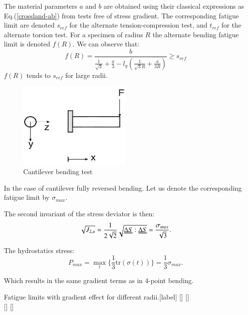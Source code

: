 \documentclass[3p,times,procedia,number]{elsarticle}
\begin{document}
The material parameters $a$ and $b$ are obtained using their classical expressions as Eq.(\ref{crossland-ab}) from tests free of stress gradient. The corresponding fatigue limit are denoted $s_{ref}$ for the alternate tension-compression test, and $t_{ref}$ for the alternate torsion test. For a specimen of radius $R$
the alternate bending fatigue limit is denoted $f(R)$.
We can observe that:
\begin{equation}
f(R)=\frac{b}{\frac{1}{\sqrt{3}}+\frac{a}{3}-l_g(\frac{1}{\sqrt{3}R}+\frac{a}{3R})}\geqslant s_{ref}
\label{crossland-fr}
\end{equation}
$f(R)$ tends to $s_{ref}$ for large radii.

\newpage
\begin{figure}[!h]
	\begin{center}
		\includegraphics[width=0.5\textwidth]{figures//fig3.jpg} 
		\caption{Cantilever bending test \cite{papadopoulos1996invariant}}
		\label{fig9}
	\end{center}
\end{figure}
In the case of cantilever fully reversed bending. Let us denote
the corresponding fatigue limit by $\sigma_{max}$.

The second invariant of the stress deviator is then:
\begin{equation}
\sqrt{J_{2,a}}=\frac{1}{2\sqrt{2}}\sqrt{\uuline{\Delta S}:\uuline{\Delta S}}=\frac{\sigma_{max}}{\sqrt{3}} .
\end{equation}

The hydrostatics stress:
\begin{equation}
P_{max}=\max\limits_{t}\{\frac{1}{3}\textrm{tr}(\sigma(t))\}=\frac{1}{3}\sigma_{max}.
\end{equation}

Which results in the same gradient terms as in 4-point bending.

\begin{Figure}{Fatigue limits with gradient effect for different radii.}[label]
	\\
\end{Figure}
\end{document}
